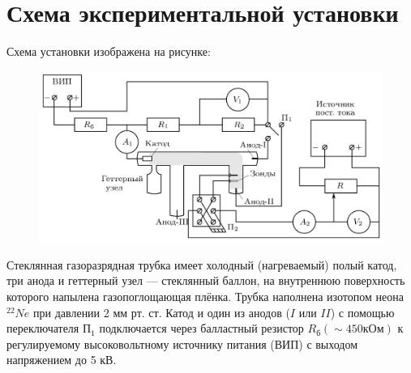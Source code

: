 \section*{Схема экспериментальной установки}

Схема установки изображена на рисунке:

\begin{figure}
	\centering
	\includegraphics[width=1\textwidth]{../res/exp scheme.png}
\end{figure}

Стеклянная газоразрядная трубка имеет холодный (нагреваемый) полый катод, три анода и геттерный узел --- стеклянный баллон, на внутреннюю поверхность которого напылена газопоглощающая плёнка. Трубка наполнена изотопом неона $^{22}Ne$ при давлении 2 мм рт. ст. Катод и один из анодов ($I$ или $II$) с помощью переключателя $П_1$ подключается через балластный резистор $R_б (\sim 450 кОм)$ к регулируемому высоковольтному источнику питания (ВИП) с выходом напряжением до 5 кВ. 